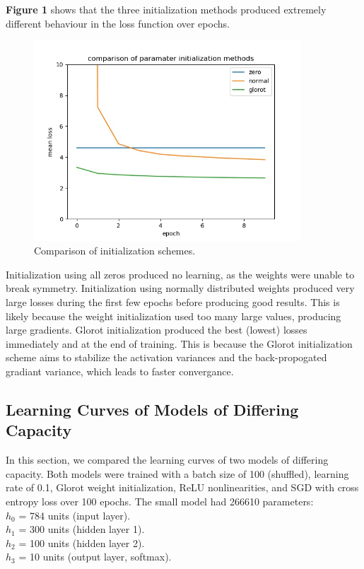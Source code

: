 \documentclass{amsart}
\theoremstyle{definition}
\theoremstyle{remark}
\numberwithin{equation}{section}
\begin{document}
\textbf{Figure 1} shows that the three initialization methods produced extremely
different behaviour in the loss function over epochs. \\

\begin{figure}[h]
\includegraphics[width=100mm]{01_init_loss}
\caption{Comparison of initialization schemes.}
\label{Figure 1}
\end{figure}

Initialization using all zeros produced no learning, as the weights were unable
to break symmetry. Initialization using normally distributed weights produced
very large losses during the first few epochs before producing good results. This
is likely because the weight initialization used too many large values, producing
large gradients. Glorot initialization produced the best (lowest) losses
immediately and at the end of training. This is because the Glorot initialization
scheme aims to stabilize the activation variances and the back-propogated
gradiant variance, which leads to faster convergance. \\


\subsection{Learning Curves of Models of Differing Capacity}

In this section, we compared the learning curves of two models of differing
capacity. Both models were trained with a batch size of 100 (shuffled), learning
rate of 0.1, Glorot weight initialization, ReLU nonlinearities, and SGD with
cross entropy loss over 100 epochs. The small model had 266610 parameters: \\

$h_0$ = 784 units (input layer). \\
$h_1$ = 300 units (hidden layer 1). \\
$h_2$ = 100 units (hidden layer 2). \\
$h_3$ = 10 units (output layer, softmax). \\
\end{document}
